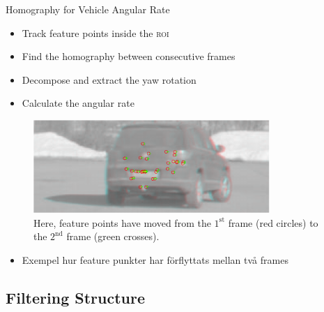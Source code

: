 \documentclass{beamer}
\newcommand{\roi}{\textsc{roi}\xspace}
\renewcommand{\a}{\r{a}\xspace}
\renewcommand{\o}{\"o\xspace}
\begin{document}
\begin{frame}{Homography for Vehicle Angular Rate}
	\begin{itemize}
		\item Track feature points inside the \roi
		\item Find the homography between consecutive frames
		\item Decompose and extract the yaw rotation
		\item Calculate the angular rate
	\end{itemize}
	\begin{figure}
		\centering
		\includegraphics[width=0.8\textwidth]{feature_point_correspondence}
		\caption{Here, feature points have moved from the $1^\text{st}$ frame (red circles) to the $2^\text{nd}$ frame (green crosses).}
	\end{figure}

	\note
	{
		\begin{itemize}
			\item Exempel hur feature punkter har f\o{}rflyttats mellan tv\a frames
		\end{itemize}
	}
\end{frame}

\subsection{Filtering Structure}
\end{document}
